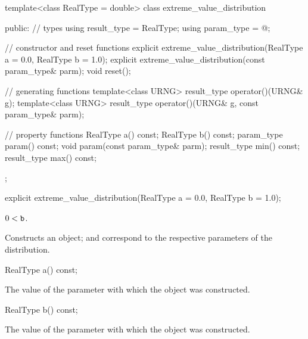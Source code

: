 \begin{codeblock}
template<class RealType = double>
 class extreme_value_distribution
{
public:
 // types
 using result_type = RealType;
 using param_type  = @\unspec@;

 // constructor and reset functions
 explicit extreme_value_distribution(RealType a = 0.0, RealType b = 1.0);
 explicit extreme_value_distribution(const param_type& parm);
 void reset();

 // generating functions
 template<class URNG>
   result_type operator()(URNG& g);
 template<class URNG>
   result_type operator()(URNG& g, const param_type& parm);

 // property functions
 RealType a() const;
 RealType b() const;
 param_type param() const;
 void param(const param_type& parm);
 result_type min() const;
 result_type max() const;
};
\end{codeblock}


%
\begin{itemdecl}
explicit extreme_value_distribution(RealType a = 0.0, RealType b = 1.0);
\end{itemdecl}

\begin{itemdescr}
\pnum\requires
 $ 0 < \texttt{b} $.

\pnum\effects Constructs an  object;
  and 
 correspond to the respective parameters of the distribution.
\end{itemdescr}

%
%
\begin{itemdecl}
RealType a() const;
\end{itemdecl}

\begin{itemdescr}
\pnum\returns The value of the  parameter
 with which the object was constructed.
\end{itemdescr}

%
%
\begin{itemdecl}
RealType b() const;
\end{itemdecl}

\begin{itemdescr}
\pnum\returns The value of the  parameter
 with which the object was constructed.
\end{itemdescr}%
%


